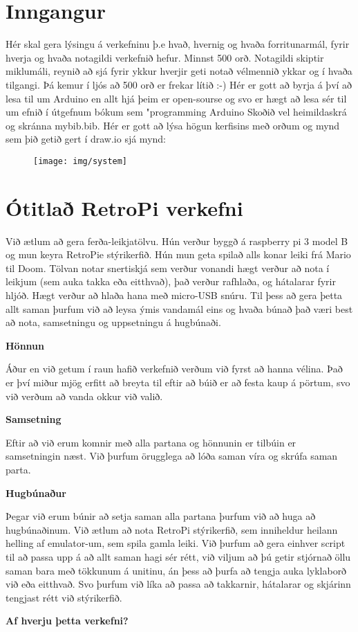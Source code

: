 \section{Inngangur}
Hér skal gera lýsingu á verkefninu þ.e hvað,  hvernig og  hvaða forritunarmál, fyrir hverja og hvaða notagildi verkefnið hefur. Minnst 500 orð. Notagildi skiptir miklumáli, reynið að sjá fyrir ykkur hverjir geti notað vélmennið ykkar og í hvaða tilgangi.  Þá kemur í ljós að 500 orð er frekar lítið :-) Hér er gott að byrja á því að lesa til um Arduino en allt hjá þeim er open-sourse og svo er hægt að lesa sér til um efnið í útgefnum bókum sem "programming Arduino \cite{monk} Skoðið vel heimildaskrá og skránna mybib.bib. Hér er gott að lýsa högun kerfisins með orðum og mynd sem þið getið gert í draw.io sjá mynd:

\begin{figure}[h]
\texttt{[image: img/system]}
\end{figure}
\section{Ótitlað RetroPi verkefni}
Við ætlum að gera ferða-leikjatölvu. Hún verður byggð á raspberry pi 3 model B og mun keyra RetroPie stýrikerfið. Hún mun geta spilað alls konar leiki frá Mario til Doom. Tölvan notar snertiskjá sem verður vonandi hægt verður að nota í leikjum (sem auka takka eða eitthvað), það verður rafhlaða, og hátalarar fyrir hljóð. Hægt verður að hlaða hana með micro-USB snúru. Til þess að gera þetta allt saman þurfum við að leysa ýmis vandamál eins og hvaða búnað það væri best að nota, samsetningu og uppsetningu á hugbúnaði.

\textbf{Hönnun}

Áður en við getum í raun hafið verkefnið verðum við fyrst að hanna vélina. Það er því miður mjög erfitt að breyta til eftir að búið er að festa kaup á pörtum, svo við verðum að vanda okkur við valið.

\textbf{Samsetning}

Eftir að við erum komnir með alla partana og hönnunin er tilbúin er samsetningin næst. Við þurfum örugglega að lóða saman víra og skrúfa saman parta.

\textbf{Hugbúnaður}

Þegar við erum búnir að setja saman alla partana þurfum við að huga að hugbúnaðinum. Við ætlum að nota RetroPi stýrikerfið, sem inniheldur heilann helling af emulator-um, sem spila gamla leiki. Við þurfum að gera einhver script til að passa upp á að allt saman hagi sér rétt, við viljum að þú getir stjórnað öllu saman bara með tökkunum á unitinu, án þess að þurfa að tengja auka lyklaborð við eða eitthvað. Svo þurfum við líka að passa að takkarnir, hátalarar og skjárinn tengjast rétt við stýrikerfið.

\textbf{Af hverju þetta verkefni?}


